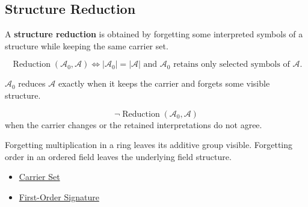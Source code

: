 \subsection*{Structure Reduction}
\label{subsec:structure-reduction}

\begin{definition}
\label{def:structure-reduction}
A \textbf{structure reduction} is obtained by forgetting some interpreted
symbols of a structure while keeping the same carrier set.
\end{definition}

\begin{remark*}
\[
\operatorname{Reduction}(\mathcal{A}_0,\mathcal{A})
\Longleftrightarrow
|\mathcal{A}_0|=|\mathcal{A}|
\text{ and } \mathcal{A}_0 \text{ retains only selected symbols of }
\mathcal{A}.
\]
\end{remark*}

\begin{remark*}
$\mathcal{A}_0$ reduces $\mathcal{A}$ exactly when it keeps the carrier and
forgets some visible structure.
\end{remark*}

\begin{remark*}
\[
\neg\operatorname{Reduction}(\mathcal{A}_0,\mathcal{A})
\]
when the carrier changes or the retained interpretations do not agree.
\end{remark*}

\begin{remark*}[Interpretation]
Forgetting multiplication in a ring leaves its additive group visible.
Forgetting order in an ordered field leaves the underlying field structure.
\end{remark*}

\begin{dependencies}
\begin{itemize}
  \item \hyperref[def:carrier-set]{Carrier Set}
  \item \hyperref[def:first-order-signature]{First-Order Signature}
\end{itemize}
\end{dependencies}
